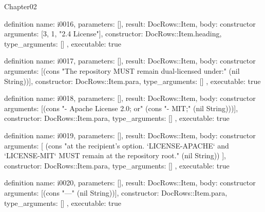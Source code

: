 \begin{lexlean}{Chapter02}
\begin{semanticmodule}
definition{
  name: i0016,
  parameters: [],
  result: DocRows::Item,
  body: constructor{
    arguments: [3, 1, "2.4 License"],
    constructor: DocRows::Item.heading,
    type_arguments: []
  },
  executable: true
}

definition{
  name: i0017,
  parameters: [],
  result: DocRows::Item,
  body: constructor{
    arguments: [(cons "The repository MUST remain dual-licensed under:" (nil String))],
    constructor: DocRows::Item.para,
    type_arguments: []
  },
  executable: true
}

definition{
  name: i0018,
  parameters: [],
  result: DocRows::Item,
  body: constructor{
    arguments: [(cons "- Apache License 2.0; or" (cons "- MIT;" (nil String)))],
    constructor: DocRows::Item.para,
    type_arguments: []
  },
  executable: true
}

definition{
  name: i0019,
  parameters: [],
  result: DocRows::Item,
  body: constructor{
    arguments: [
      (cons "at the recipient's option. `LICENSE-APACHE` and `LICENSE-MIT` MUST remain at the repository root." (nil String))
    ],
    constructor: DocRows::Item.para,
    type_arguments: []
  },
  executable: true
}

definition{
  name: i0020,
  parameters: [],
  result: DocRows::Item,
  body: constructor{
    arguments: [(cons "---" (nil String))],
    constructor: DocRows::Item.para,
    type_arguments: []
  },
  executable: true
}
\end{semanticmodule}
\end{lexlean}
